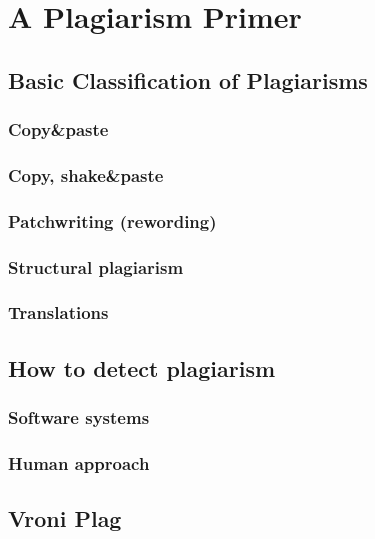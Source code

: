 ﻿\chapter{A Plagiarism Primer}\label{chap:plagOverview}

\section{Basic Classification of Plagiarisms}

\subsection{Copy\&paste}
\subsection{Copy, shake\&paste}
\subsection{Patchwriting (rewording)}
\subsection{Structural plagiarism}
\subsection{Translations}

\section{How to detect plagiarism}
\subsection{Software systems}
\subsection{Human approach}

\section{Vroni Plag}
